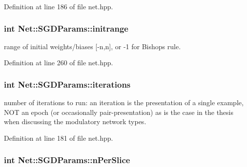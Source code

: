 Definition at line 186 of file net.\+hpp.

\subsubsection[{\texorpdfstring{initrange}{initrange}}]{\setlength{\rightskip}{0pt plus 5cm}int Net\+::\+S\+G\+D\+Params\+::initrange}\hypertarget{structNet_1_1SGDParams_a72a223aa181553352d9f607522448925}{}\label{structNet_1_1SGDParams_a72a223aa181553352d9f607522448925}


range of initial weights/biases \mbox{[}-\/n,n\mbox{]}, or -\/1 for Bishop\textquotesingle{}s rule. 



Definition at line 260 of file net.\+hpp.

\subsubsection[{\texorpdfstring{iterations}{iterations}}]{\setlength{\rightskip}{0pt plus 5cm}int Net\+::\+S\+G\+D\+Params\+::iterations}\hypertarget{structNet_1_1SGDParams_a6bcf8009821f63ec9b7564f51cdeb5e9}{}\label{structNet_1_1SGDParams_a6bcf8009821f63ec9b7564f51cdeb5e9}


number of iterations to run\+: an iteration is the presentation of a single example, N\+OT an epoch (or occasionally pair-\/presentation) as is the case in the thesis when discussing the modulatory network types. 



Definition at line 181 of file net.\+hpp.

\subsubsection[{\texorpdfstring{n\+Per\+Slice}{nPerSlice}}]{\setlength{\rightskip}{0pt plus 5cm}int Net\+::\+S\+G\+D\+Params\+::n\+Per\+Slice}\hypertarget{structNet_1_1SGDParams_a99878fc2d2ab3a0a70de52d9c04b1a64}{}\label{structNet_1_1SGDParams_a99878fc2d2ab3a0a70de52d9c04b1a64}


